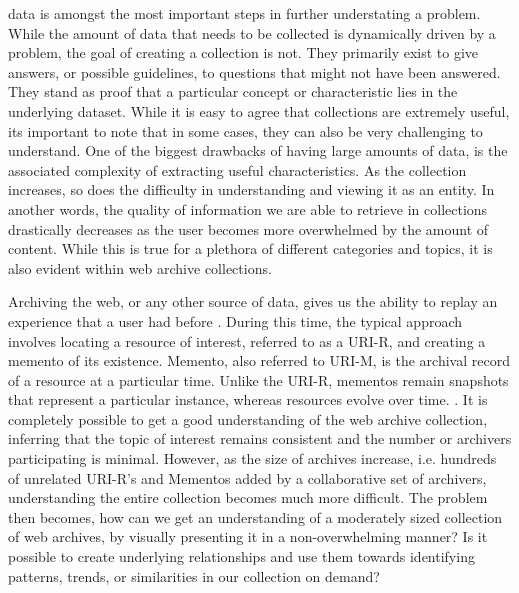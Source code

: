 \documentclass[10pt,journal,compsoc]{IEEEtran}
\begin{document}
 data is amongst the most important steps in further understating a problem. While the amount of data that needs to be collected is dynamically driven by a problem, the goal of creating a collection is not. They primarily exist to give answers, or possible guidelines, to questions that might not have been answered. They stand as proof that a particular concept or characteristic lies in the underlying dataset. While it is easy to agree that collections are extremely useful, its important to note that in some cases, they can also be very challenging to understand. One of the biggest drawbacks of having large amounts of data, is the associated complexity of extracting useful characteristics.  As the collection increases, so does the difficulty in understanding and viewing it as an entity. In another words, the quality of information we are able to retrieve in collections drastically decreases as the user becomes more overwhelmed by the amount of content. While this is true for a plethora of different categories and topics, it is also evident within web archive collections. \par

Archiving the web, or any other source of data, gives us the ability to replay an experience that a user had before \cite{kelly2014archival}. During this time, the typical approach involves locating a resource of interest, referred to as a URI-R, and creating a memento of its existence. Memento, also referred to URI-M, is the archival record of a resource at a particular time. Unlike the URI-R, mementos remain snapshots that represent a particular instance, whereas resources evolve over time. \cite{van2009memento}. It is completely possible to get a good understanding of the web archive collection, inferring that the topic of interest remains consistent and the number or archivers participating is minimal. However, as the size of archives increase, i.e. hundreds of unrelated URI-R’s and Mementos added by a collaborative set of archivers, understanding the entire collection becomes much more difficult. The problem then becomes, how can we get an understanding of a moderately sized collection of web archives, by visually presenting it in a non-overwhelming manner? Is it possible to create underlying relationships and use them towards identifying patterns, trends, or similarities in our collection on demand? \par
\end{document}
